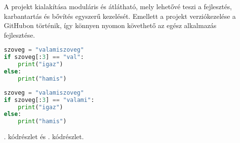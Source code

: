 A projekt kialakítása moduláris és átlátható, mely lehetővé teszi a fejlesztés, karbantartás és bővítés egyszerű kezelését.
Emellett a projekt verziókezelése a GitHubon történik, így könnyen nyomon követhető az egész alkalmazás fejlesztése.



\begin{lstlisting}[caption={Hogyan ne írjunk kódot},label={lst:stringstartswith}, language={Python}]
szoveg = "valamiszoveg"
if szoveg[:3] == "val":
    print("igaz")
else:
    print("hamis")
\end{lstlisting}

\lipsum[1]

\begin{lstlisting}[caption={Miből lehet probléma},label={lst:stringstartswith2}, language={Python}]
szoveg = "valamiszoveg"
if szoveg[:3] == "valami":
    print("igaz")
else:
    print("hamis")
\end{lstlisting}

. kódrészlet és . kódrészlet.